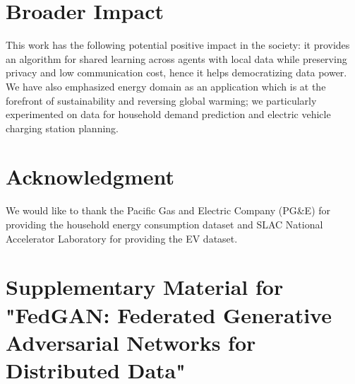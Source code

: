 \documentclass{article}
\begin{document}
\label{sec:concl}



\section{Broader Impact}
This work has the following potential positive impact in the society: it provides an algorithm for shared learning across agents with local data while preserving privacy and low communication cost, hence it helps democratizing data power. We have also emphasized energy domain as an application which is at the forefront of sustainability and reversing global warming; we particularly experimented on data for household demand prediction and electric vehicle charging station planning.

\section*{Acknowledgment}

We would like to thank the Pacific Gas and Electric Company (PG\&E) for providing the household energy consumption dataset and SLAC National Accelerator Laboratory for providing the EV dataset.







\onecolumn
\appendix

\section*{Supplementary Material for "FedGAN: Federated Generative Adversarial Networks for Distributed Data"}
\end{document}
